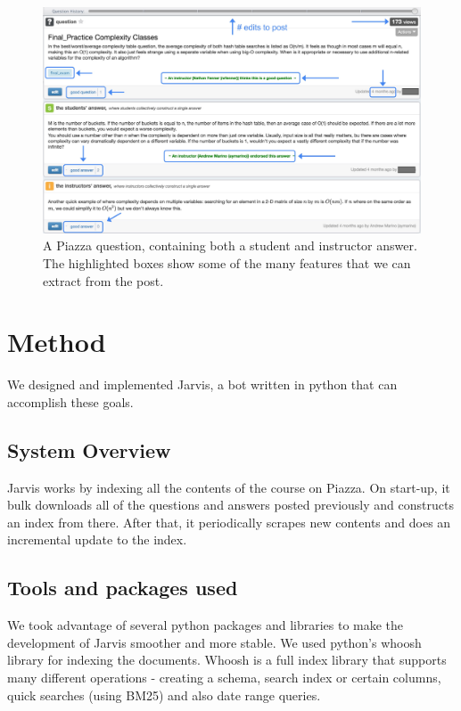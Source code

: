 \documentclass[sigconf]{acmart}
\begin{document}
\begin{figure}
\caption{A Piazza question, containing both a student and instructor answer. The highlighted boxes show some of the many features that we can extract from the post.}
\includegraphics[width=\textwidth]{piazza_stats}
\end{figure}

\section{Method}
We designed and implemented Jarvis, a bot written in python that can accomplish these goals. 

\subsection{System Overview}
Jarvis works by indexing all the contents of the course on Piazza. On start-up, it bulk downloads all of the questions and answers posted previously and constructs an index from there. After that, it periodically scrapes new contents and does an incremental update to the index.

\subsection{Tools and packages used}
We took advantage of several python packages and libraries to make the development of Jarvis smoother and more stable. We used python's whoosh library for indexing the documents. Whoosh is a full index library that supports many different operations - creating a schema, search index or certain columns, quick searches (using BM25) and also date range queries. 
\end{document}
